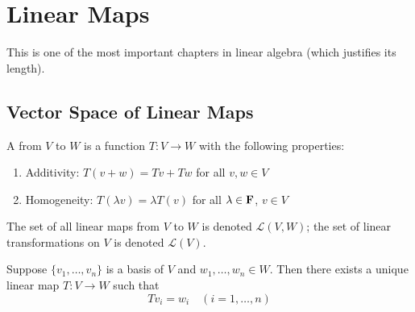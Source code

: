 \chapter{Linear Maps}\label{chap:linear-maps}
This is one of the most important chapters in linear algebra (which justifies its length).

\section{Vector Space of Linear Maps}
\begin{definition}
A  from $V$ to $W$ is a function $T:V\to W$ with the following properties:
\begin{enumerate}[label=(\roman*)]
\item Additivity: $T(v+w)=Tv+Tw$ for all $v,w\in V$
\item Homogeneity: $T(\lambda v)=\lambda T(v)$ for all $\lambda\in\mathbf F$, $v\in V$
\end{enumerate}
\end{definition}

\begin{notation}
The set of all linear maps from $V$ to $W$ is denoted $\mathcal{L}(V,W)$; the set of linear transformations on $V$ is denoted $\mathcal{L}(V)$.
\end{notation}

\begin{lemma}
Suppose $\{v_1,\dots,v_n\}$ is a basis of $V$ and $w_1,\dots,w_n\in W$. Then there exists a unique linear map $T:V\to W$ such that
\[Tv_i=w_i\quad(i=1,\dots,n)\]
\end{lemma}

